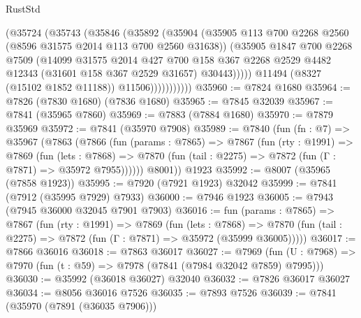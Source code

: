 \begin{lexlean}{RustStd}
\begin{coremodule}
{\begin{coremodule}
{{{{{{{{{{{{{{{{{{{{{{{{{{{{{{{{{{{{{{{{{{{{{{{{{{{{{{                      (@35724
                        (@35743
                          (@35846
                            (@35892
                              (@35904
                                (@35905
                                  @113
                                  @700
                                  @2268
                                  @2560
                                  (@8596 @31575 @2014 @113 @700 @2560 @31638))
                                (@35905
                                  @1847
                                  @700
                                  @2268
                                  @7509
                                  (@14099
                                    @31575
                                    @2014
                                    @427
                                    @700
                                    @158
                                    @367
                                    @2268
                                    @2529
                                    @4482
                                    @12343
                                    (@31601 @158 @367 @2529 @31657)
                                    @30443)))))
                          @11494
                          (@8327 (@15102 @1852 @11188))
                          @11506)))))))))))
@35960 := @7824 @1680
@35964 := @7826 (@7830 @1680) (@7836 @1680)
@35965 := @7845 @32039
@35967 := @7841 (@35965 @7860)
@35969 := @7883 (@7884 @1680)
@35970 := @7879 @35969
@35972 := @7841 (@35970 @7908)
@35989 := @7840
    (fun (fn : @7) =>
    @35967
      (@7863
        (@7866
          (fun (params : @7865) =>
          @7867
            (fun (rty : @1991) =>
            @7869
              (fun (lets : @7868) =>
              @7870 (fun (tail : @2275) => @7872 (fun (Γ : @7871) => @35972 @7955))))))
        @8001))
    @1923
@35992 := @8007 (@35965 (@7858 @1923))
@35995 := @7920 (@7921 @1923) @32042
@35999 := @7841 (@7912 (@35995 @7929) @7933)
@36000 := @7946 @1923
@36005 := @7943 (@7945 @36000 @32045 @7901 @7903)
@36016 := fun (params : @7865) =>
  @7867
    (fun (rty : @1991) =>
    @7869
      (fun (lets : @7868) =>
      @7870 (fun (tail : @2275) => @7872 (fun (Γ : @7871) => @35972 (@35999 @36005)))))
@36017 := @7866 @36016
@36018 := @7863 @36017
@36027 := @7969
    (fun (U : @7968) => @7970 (fun (t : @59) => @7978 (@7841 (@7984 @32042 @7859) @7995)))
@36030 := @35992 (@36018 @36027) @32040
@36032 := @7826 @36017 @36027
@36034 := @8056 @36016 @7526
@36035 := @7893 @7526
@36039 := @7841 (@35970 (@7891 (@36035 @7906)))
}}}}}}}}}}}}}}}}}}}}}}}}}}}}}}}}}}}}}}}}}}}}}}}}}}}}}}
\end{coremodule}}
\end{coremodule}
\end{lexlean}
